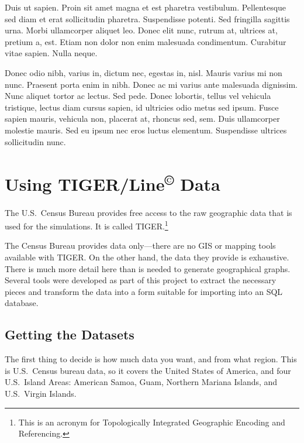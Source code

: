 \documentclass[11pt,letterpaper,onecolumn,twoside,openright,final]{report}
\begin{document}
Duis ut sapien.
Proin sit amet magna et est pharetra vestibulum.
Pellentesque sed diam et erat sollicitudin pharetra.
Suspendisse potenti.
Sed fringilla sagittis urna.
Morbi ullamcorper aliquet leo.
Donec elit nunc, rutrum at, ultrices at, pretium a, est.
Etiam non dolor non enim malesuada condimentum.
Curabitur vitae sapien.
Nulla neque.

Donec odio nibh, varius in, dictum nec, egestas in, nisl.
Mauris varius mi non nunc.
Praesent porta enim in nibh.
Donec ac mi varius ante malesuada dignissim.
Nunc aliquet tortor ac lectus.
Sed pede.
Donec lobortis, tellus vel vehicula tristique, lectus diam cursus sapien, id ultricies odio metus sed ipsum.
Fusce sapien mauris, vehicula non, placerat at, rhoncus sed, sem.
Duis ullamcorper molestie mauris.
Sed eu ipsum nec eros luctus elementum.
Suspendisse ultrices sollicitudin nunc.


\appendix
\chapter{Using TIGER/Line\textsuperscript{\scriptsize{\copyright}} Data}
\vspace{0.5cm}

The U.S.~Census Bureau provides free access to the raw geographic data that is used for the simulations.
It is called TIGER.\footnote{This is an acronym for Topologically Integrated Geographic Encoding and Referencing.}

The Census Bureau provides data only---there are no GIS or mapping tools available with TIGER.
On the other hand, the data they provide is exhaustive.
There is much more detail here than is needed to generate geographical graphs.
Several tools were developed as part of this project to extract the necessary pieces and transform the data into a form suitable for importing into an SQL database.

\section{Getting the Datasets}
The first thing to decide is how much data you want, and from what region.
This is U.S.~Census bureau data, so it covers the United States of America, and four U.S.~Island Areas: American Samoa, Guam, Northern Mariana Islands, and U.S.~Virgin Islands.
\end{document}
